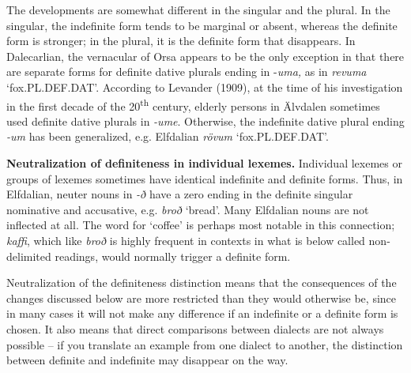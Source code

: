 \begin{styleBodytextC}
The developments are somewhat different in the singular and the plural. In the singular, the indefinite form tends to be marginal or absent, whereas the definite form is stronger; in the plural, it is the definite form that disappears. In Dalecarlian,  the vernacular of Orsa appears to be the only exception in that there are separate forms for definite dative plurals ending in \nobreakdash-\textit{uma, }as in \textit{revuma} ‘fox.PL.DEF.DAT’. According to Levander\textsc{ (1909)}, at the time of his investigation in the first decade of the 20\textsuperscript{th} century, elderly persons in Älvdalen sometimes used definite dative plurals in\textit{ \nobreakdash-ume}.  Otherwise, the indefinite dative plural ending \textit{\nobreakdash-um} has been generalized, e.g. Elfdalian \textit{rövum} ‘fox.PL.DEF.DAT’.

\end{styleBodytextC}

\begin{styleBodytextC}
\textbf{Neutralization of definiteness in individual lexemes. }Individual lexemes or groups of lexemes sometimes have identical indefinite and definite forms. Thus, in Elfdalian, neuter nouns in \textit{\nobreakdash-ð }have a zero ending in the definite singular nominative and accusative, e.g. \textit{broð} ‘bread’. Many Elfdalian nouns are not inflected at all.  The word for ‘coffee’ is perhaps most notable in this connection; \textit{kaffi}, which like \textit{broð} is highly frequent in contexts in what is below called non-delimited readings, would normally trigger a definite form. 

\end{styleBodytextC}

\begin{styleBodytextC}
Neutralization of the definiteness distinction means that the consequences of the changes discussed below are more restricted than they would otherwise be, since in many cases it will not make any difference if an indefinite or a definite form is chosen. It also means that direct comparisons between dialects are not always possible – if you translate an example from one dialect to another, the distinction between definite and indefinite may disappear on the way. 

\end{styleBodytextC}


